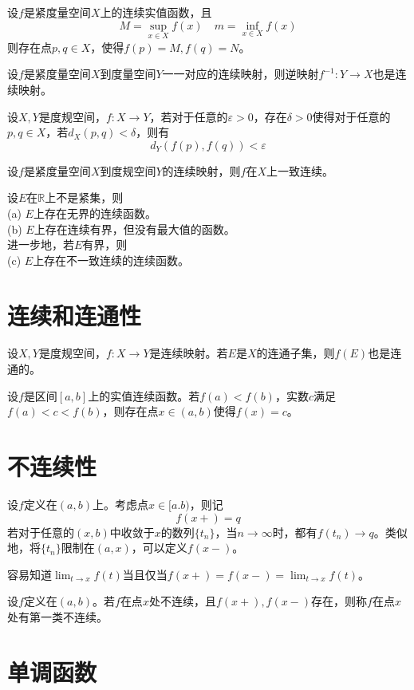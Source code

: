 \documentclass{article}
\newcommand{\ra}{\rightarrow}
\newcommand{\ds}{\displaystyle}
\newcommand{\RR}{\mathbb{R}}
\newcommand{\ve}{\varepsilon}
\begin{document}
\begin{theorem}
    设\(f\)是紧度量空间\(X\)上的连续实值函数，且\[
    M =\sup_{x\in X}f(x)\quad m=\inf_{x\in X}f(x)
    \]则存在点\(p,q\in X\)，使得\(f(p)=M,f(q)=N\)。
\end{theorem}

\begin{theorem}
    设\(f\)是紧度量空间\(X\)到度量空间\(Y\)一一对应的连续映射，则逆映射\(f^{-1}:Y\ra X\)也是连续映射。
\end{theorem}

\begin{definition}
    设\(X,Y\)是度规空间，\(f:X\ra Y\)，若对于任意的\(\ve>0\)，存在\(\delta>0\)使得对于任意的\(p,q\in X\)，若\(d_X(p,q)<\delta\)，则有\[
    d_Y(f(p),f(q)) <\ve
    \]
\end{definition}

\begin{theorem}
    设\(f\)是紧度量空间\(X\)到度规空间\(Y\)的连续映射，则\(f\)在\(X\)上一致连续。
\end{theorem}

\begin{theorem}
    设\(E\)在\(\RR\)上不是紧集，则\\
    (a) \(E\)上存在无界的连续函数。\\
    (b) \(E\)上存在连续有界，但没有最大值的函数。\\
    进一步地，若\(E\)有界，则\\
    (c) \(E\)上存在不一致连续的连续函数。
\end{theorem}

\section{连续和连通性}
\begin{theorem}
    设\(X,Y\)是度规空间，\(f:X\ra Y\)是连续映射。若\(E\)是\(X\)的连通子集，则\(f(E)\)也是连通的。
\end{theorem}

\begin{theorem}
    设\(f\)是区间\([a,b]\)上的实值连续函数。若\(f(a)<f(b)\)，实数\(c\)满足\(f(a)<c<f(b)\)，则存在点\(x\in (a,b)\)使得\(f(x) =c\)。
\end{theorem}


\section{不连续性}
\begin{definition}
    设\(f\)定义在\((a,b)\)上。考虑点\(x\in[a.b)\)，则记\[
    f(x+)=q
    \]若对于任意的\((x,b)\)中收敛于\(x\)的数列\(\{t_n\}\)，当\(n\ra\infty\)时，都有\(f(t_n)\ra q\)。类似地，将\(\{t_n\}\)限制在\((a,x)\)，可以定义\(f(x-)\)。
\end{definition}

容易知道\(\ds\lim_{t\ra x}f(t)\)当且仅当\(f(x+)=f(x-)=\ds\lim_{t\ra x}f(t)\)。
\begin{definition}
    设\(f\)定义在\((a,b)\)。若\(f\)在点\(x\)处不连续，且\(f(x+),f(x-)\)存在，则称\(f\)在点\(x\)处有第一类不连续。
\end{definition}
\section{单调函数}
\end{document}
